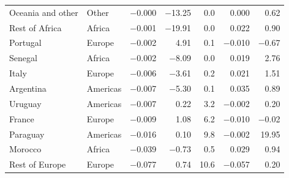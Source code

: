 \begin{table}[!htbp]
\begin{tabular}{llrrrrr}
Oceania and other & Other & $-$0.000 & $-$13.25 & 0.0 & 0.000 & 0.62\\
Rest of Africa & Africa & $-$0.001 & $-$19.91 & 0.0 & 0.022 & 0.90\\
Portugal & Europe & $-$0.002 & 4.91 & 0.1 & $-$0.010 & $-$0.67\\
Senegal & Africa & $-$0.002 & $-$8.09 & 0.0 & 0.019 & 2.76\\
Italy & Europe & $-$0.006 & $-$3.61 & 0.2 & 0.021 & 1.51\\
Argentina & Americas & $-$0.007 & $-$5.30 & 0.1 & 0.035 & 0.89\\
Uruguay & Americas & $-$0.007 & 0.22 & 3.2 & $-$0.002 & 0.20\\
France & Europe & $-$0.009 & 1.08 & 6.2 & $-$0.010 & $-$0.02\\
Paraguay & Americas & $-$0.016 & 0.10 & 9.8 & $-$0.002 & 19.95\\
Morocco & Africa & $-$0.039 & $-$0.73 & 0.5 & 0.029 & 0.94\\
Rest of Europe & Europe & $-$0.077 & 0.74 & 10.6 & $-$0.057 & 0.20\\
\bottomrule\end{tabular}
\end{table}
